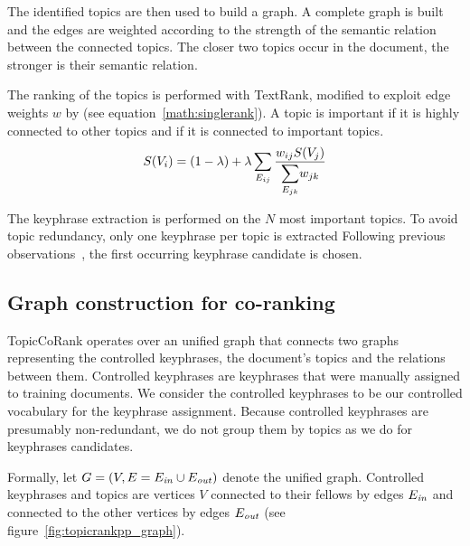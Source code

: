     The identified topics are then used to build a graph.
    A complete graph  is built and the edges are weighted according to the strength of the semantic
    relation between the connected topics. The closer two topics occur in the
    document, the stronger is their semantic relation.
    
    The ranking of the topics is performed with TextRank, modified to exploit edge
    weights $w$ by  (see equation~\ref{math:singlerank}).
    A topic is important if it is highly connected to other topics and if it is
    connected to important topics.
    \begin{align}
      S(V_i) = (1 - \lambda) + \lambda \sum_{E_{ij}}{\frac{w_{ij}S(V_j)}{\mathlarger\sum_{E_{jk}}{w_{jk}}}}\label{math:singlerank}
    \end{align}
      
    The keyphrase extraction is performed on the $N$  most important topics. To
    avoid topic redundancy, only one
    keyphrase per topic is extracted
    Following previous observations~\cite{witten1999kea},
    the first occurring keyphrase candidate is chosen.

  \subsection{Graph construction for co-ranking}
  \label{subsec:graph_construction}
    TopicCoRank operates over an unified graph that connects two graphs
    representing the controlled keyphrases, the document's topics and
    the relations between them. Controlled keyphrases are keyphrases
    that were manually assigned to training documents. We consider the 
    controlled keyphrases
    to be our controlled vocabulary for the keyphrase assignment. %
    Because controlled keyphrases are presumably non-redundant, we do not 
    group them by topics as we do for keyphrases candidates.
    
    Formally, let
    $G = (V, E=E_{\textnormal{\textit{in}}} \cup E_{\textnormal{\textit{out}}})$
    denote the unified graph. Controlled keyphrases and topics are vertices $V$
    connected to their fellows by edges $E_\textnormal{\textit{in}}$ and
    connected to the other vertices by edges $E_\textnormal{\textit{out}}$ (see
    figure~\ref{fig:topicrankpp_graph}).
    
